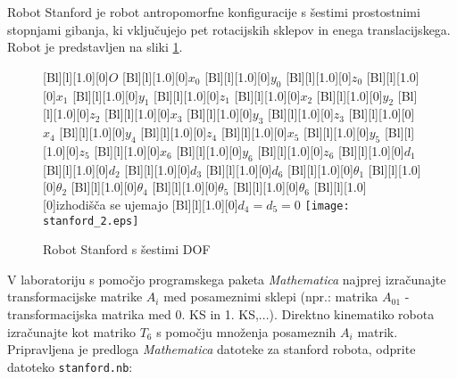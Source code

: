 Robot Stanford je robot antropomorfne konfiguracije s šestimi prostostnimi
stopnjami gibanja, ki vključujejo pet rotacijskih sklepov in enega
translacijskega. Robot je predstavljen na sliki \ref{stanford}.
\begin{figure}[h]
\centering {}[Bl][l][1.0][0]{$O$} [Bl][l][1.0][0]{$x_0$}
[Bl][l][1.0][0]{$y_0$} [Bl][l][1.0][0]{$z_0$}
[Bl][l][1.0][0]{$x_1$} [Bl][l][1.0][0]{$y_1$}
[Bl][l][1.0][0]{$z_1$} [Bl][l][1.0][0]{$x_2$}
[Bl][l][1.0][0]{$y_2$} [Bl][l][1.0][0]{$z_2$}
[Bl][l][1.0][0]{$x_3$} [Bl][l][1.0][0]{$y_3$}
[Bl][l][1.0][0]{$z_3$} [Bl][l][1.0][0]{$x_4$}
[Bl][l][1.0][0]{$y_4$} [Bl][l][1.0][0]{$z_4$}
[Bl][l][1.0][0]{$x_5$} [Bl][l][1.0][0]{$y_5$}
[Bl][l][1.0][0]{$z_5$} [Bl][l][1.0][0]{$x_6$}
[Bl][l][1.0][0]{$y_6$} [Bl][l][1.0][0]{$z_6$}
[Bl][l][1.0][0]{$d_1$} [Bl][l][1.0][0]{$d_2$}
[Bl][l][1.0][0]{$d_3$} [Bl][l][1.0][0]{$d_6$}
[Bl][l][1.0][0]{$\theta_1$}
[Bl][l][1.0][0]{$\theta_2$}
[Bl][l][1.0][0]{$\theta_4$}
[Bl][l][1.0][0]{$\theta_5$}
[Bl][l][1.0][0]{$\theta_6$} [Bl][l][1.0][0]{izhodišča
se ujemajo} [Bl][l][1.0][0]{$d_4 = d_5 = 0$}
\texttt{[image: stanford\_2.eps]}
  \caption{\label{stanford} Robot Stanford s šestimi DOF}
\end{figure}

V laboratoriju s pomočjo programskega paketa \emph{Mathematica} najprej izračunajte
transformacijske matrike $A_i$ med posameznimi sklepi (npr.: matrika $A_{01}$
- transformacijska matrika med 0. KS in 1. KS,...). Direktno kinematiko robota
izračunajte kot matriko $T_6$ s pomočju množenja posameznih $A_i$ matrik. Pripravljena je
predloga \emph{Mathematica} datoteke za stanford robota, odprite datoteko \verb"stanford.nb":

